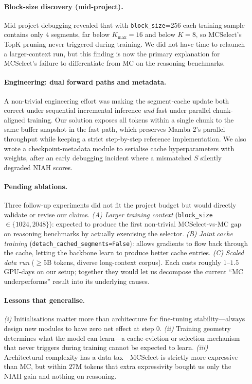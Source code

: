 \documentclass{article}
\begin{document}
\paragraph{Block-size discovery (mid-project).} Mid-project debugging revealed that with \texttt{block\_size}=256 each training sample contains only $4$ segments, far below $K_{\max}{=}16$ and below $K{=}8$, so MCSelect's TopK pruning never triggered during training. We did not have time to relaunch a larger-context run, but this finding is now the primary explanation for MCSelect's failure to differentiate from MC on the reasoning benchmarks.

\paragraph{Engineering: dual forward paths and metadata.} A non-trivial engineering effort was making the segment-cache update both correct under sequential incremental inference \emph{and} fast under parallel chunk-aligned training. Our solution exposes all tokens within a single chunk to the same buffer snapshot in the fast path, which preserves Mamba-2's parallel throughput while keeping a strict step-by-step reference implementation. We also wrote a checkpoint-metadata module to serialise cache hyperparameters with weights, after an early debugging incident where a mismatched $S$ silently degraded NIAH scores.

\paragraph{Pending ablations.} Three follow-up experiments did not fit the project budget but would directly validate or revise our claims. \emph{(A) Larger training context} (\texttt{block\_size}$\in\{1024,2048\}$): expected to produce the first non-trivial MCSelect-vs-MC gap on reasoning benchmarks by actually exercising the selector. \emph{(B) Joint cache training} (\texttt{detach\_cached\_segments=False}): allows gradients to flow back through the cache, letting the backbone learn to produce better cache entries. \emph{(C) Scaled data run} ($\ge\!5$B tokens, diverse long-context corpus). Each costs roughly $1$--$1.5$ GPU-days on our setup; together they would let us decompose the current ``MC underperforms'' result into its underlying causes.

\paragraph{Lessons that generalise.}
\emph{(i)} Initialisations matter more than architecture for fine-tuning stability---always design new modules to have zero net effect at step 0.
\emph{(ii)} Training geometry determines what the model can learn---a cache-eviction or selection mechanism that never triggers during training cannot be expected to learn.
\emph{(iii)} Architectural complexity has a data tax---MCSelect is strictly more expressive than MC, but within $27$M tokens that extra expressivity bought us only the NIAH gain and nothing on reasoning.
\end{document}
